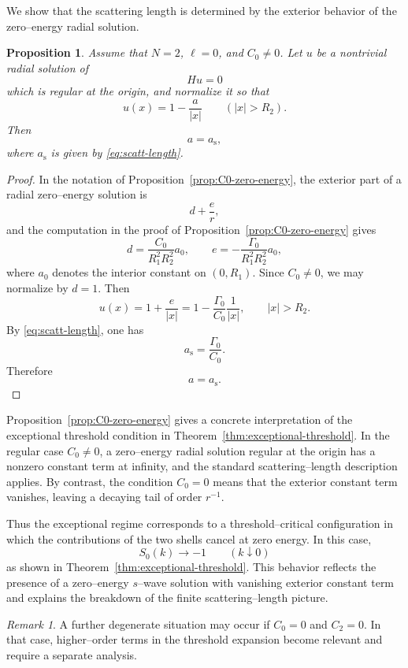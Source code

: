 \documentclass[a4paper,11pt]{article}
\numberwithin{equation}{section}
\newtheorem{prop}[thm]{Proposition}
\theoremstyle{definition}
\theoremstyle{remark}
\newtheorem{rem}[thm]{Remark}
\begin{document}
We show that the scattering length is determined by the exterior behavior of
the zero--energy radial solution.

\begin{prop}
\label{prop:scatt-length-zero-energy}
Assume that $N=2$, $\ell=0$, and $C_0\neq0$. Let $u$ be a nontrivial radial
solution of
\[
Hu=0
\]
which is regular at the origin, and normalize it so that
\[
u(x)=1-\frac{a}{|x|}
\qquad (|x|>R_2).
\]
Then
\[
a=a_{\mathrm s},
\]
where $a_{\mathrm s}$ is given by \eqref{eq:scatt-length}.
\end{prop}

\begin{proof}
In the notation of Proposition~\ref{prop:C0-zero-energy}, the exterior part of
a radial zero--energy solution is
\[
d+\frac{e}{r},
\]
and the computation in the proof of
Proposition~\ref{prop:C0-zero-energy} gives
\[
d=\frac{C_0}{R_1^2R_2^2}a_0,
\qquad
e=-\frac{\Gamma_0}{R_1^2R_2^2}a_0,
\]
where $a_0$ denotes the interior constant on $(0,R_1)$. Since $C_0\neq0$, we
may normalize by $d=1$. Then
\[
u(x)
=
1+\frac{e}{|x|}
=
1-\frac{\Gamma_0}{C_0}\frac{1}{|x|},
\qquad |x|>R_2.
\]
By \eqref{eq:scatt-length}, one has
\[
a_{\mathrm s}=\frac{\Gamma_0}{C_0}.
\]
Therefore
\[
a=a_{\mathrm s}.
\]
\end{proof}
Proposition~\ref{prop:C0-zero-energy} gives a concrete interpretation of the
exceptional threshold condition in
Theorem~\ref{thm:exceptional-threshold}. In the regular case $C_0\neq0$, a
zero--energy radial solution regular at the origin has a nonzero constant term
at infinity, and the standard scattering--length description applies. By
contrast, the condition $C_0=0$ means that the exterior constant term
vanishes, leaving a decaying tail of order $r^{-1}$.

Thus the exceptional regime corresponds to a threshold--critical configuration
in which the contributions of the two shells cancel at zero energy. In this
case,
$$
S_0(k)\to -1
\qquad (k\downarrow0)
$$
as shown in Theorem~\ref{thm:exceptional-threshold}. 
This behavior reflects the presence of a zero--energy $s$--wave solution with vanishing exterior
constant term and explains the breakdown of the finite scattering--length
picture.

\begin{rem}
A further degenerate situation may occur if $C_0=0$ and $C_2=0$. In that case,
higher--order terms in the threshold expansion become relevant and require a
separate analysis.
\end{rem}
\end{document}

